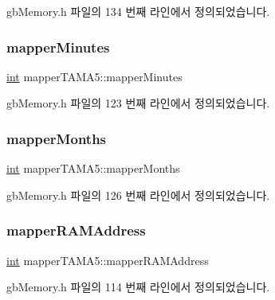 gb\+Memory.\+h 파일의 134 번째 라인에서 정의되었습니다.

\mbox{\label{structmapper_t_a_m_a5_aeda85e46297097650e96cb4d39d238b0}} 
\subsubsection{\texorpdfstring{mapper\+Minutes}{mapperMinutes}}
{\footnotesize\ttfamily \mbox{\hyperlink{_util_8cpp_a0ef32aa8672df19503a49fab2d0c8071}{int}} mapper\+T\+A\+M\+A5\+::mapper\+Minutes}



gb\+Memory.\+h 파일의 123 번째 라인에서 정의되었습니다.

\mbox{\label{structmapper_t_a_m_a5_ad085d7e9850d22965300876cf540bc4f}} 
\subsubsection{\texorpdfstring{mapper\+Months}{mapperMonths}}
{\footnotesize\ttfamily \mbox{\hyperlink{_util_8cpp_a0ef32aa8672df19503a49fab2d0c8071}{int}} mapper\+T\+A\+M\+A5\+::mapper\+Months}



gb\+Memory.\+h 파일의 126 번째 라인에서 정의되었습니다.

\mbox{\label{structmapper_t_a_m_a5_a35ce9e6605c0506391bd92b2a8b0bb9c}} 
\subsubsection{\texorpdfstring{mapper\+R\+A\+M\+Address}{mapperRAMAddress}}
{\footnotesize\ttfamily \mbox{\hyperlink{_util_8cpp_a0ef32aa8672df19503a49fab2d0c8071}{int}} mapper\+T\+A\+M\+A5\+::mapper\+R\+A\+M\+Address}



gb\+Memory.\+h 파일의 114 번째 라인에서 정의되었습니다.

